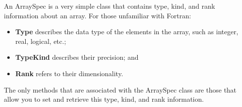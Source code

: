 
An ArraySpec is a very simple class that contains 
type, kind, and rank information about an array.  For those 
unfamiliar with Fortran:
\begin{itemize}
\item {\bf Type} describes the data type of the elements in the array, 
such as integer, real, logical, etc.;
\item {\bf TypeKind} describes their precision; and
\item {\bf Rank} refers to their dimensionality.
\end{itemize}

The only methods that are associated with the ArraySpec class are those 
that allow you to set and retrieve this type, kind, and rank information.







